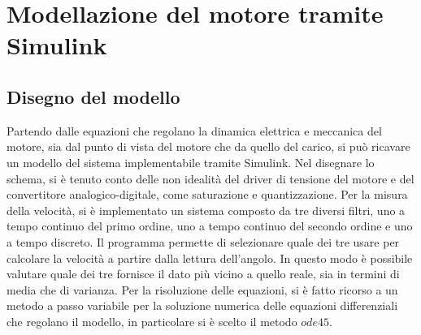 \documentclass[a4paper, 12pt, Arial]{article}
\begin{document}
\section{Modellazione del motore tramite Simulink}
\subsection{Disegno del modello}
Partendo dalle equazioni che regolano la dinamica elettrica e meccanica del motore, sia dal punto di vista del motore che da quello del carico, si può ricavare un modello del sistema implementabile tramite Simulink. Nel disegnare lo schema, si è tenuto conto delle non idealità del driver di tensione del motore e del convertitore analogico-digitale, come saturazione e quantizzazione. Per la misura della velocità, si è implementato un sistema composto da tre diversi filtri, uno a tempo continuo del primo ordine, uno a tempo continuo del secondo ordine e uno a tempo discreto. Il programma permette di selezionare quale dei tre usare per calcolare la velocità a partire dalla lettura dell'angolo. In questo modo è possibile valutare quale dei tre fornisce il dato più vicino a quello reale, sia in termini di media che di varianza. Per la risoluzione delle equazioni, si è fatto ricorso a un metodo a passo variabile per la soluzione numerica delle equazioni differenziali che regolano il modello, in particolare si è scelto il metodo $ode45$.
\end{document}
